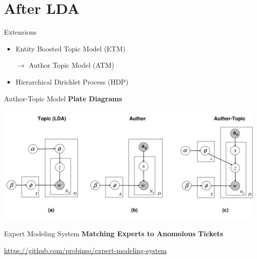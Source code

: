 \documentclass[10pt]{beamer}
\begin{document}
\section{After LDA}
\begin{frame}{Extensions}
  \begin{itemize}
  \item Entity Boosted Topic Model (ETM)
  \item[$\rightarrow$] Author Topic Model (ATM)
  \item Hierarchical Dirichlet Process (HDP)
  \end{itemize}
\end{frame}

\begin{frame}{Author-Topic Model}
  {\bf Plate Diagrams}

    \includegraphics[width=\textwidth]{plates.png}

\end{frame}

\begin{frame}{Expert Modeling System}
  {\bf Matching Experts to Anomolous Tickets}

  \url{https://github.com/probinso/expert-modeling-system}
\end{frame}
\end{document}
